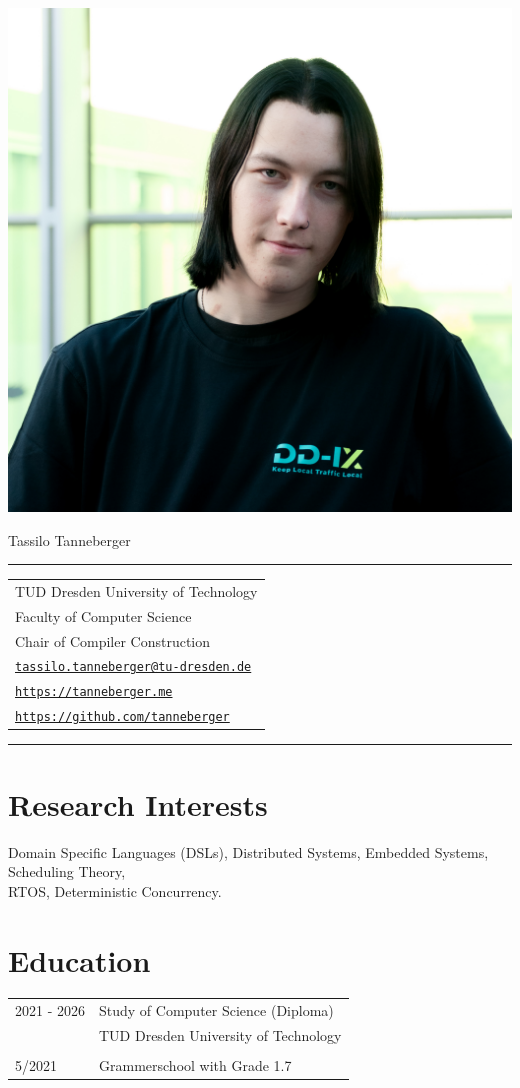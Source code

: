 \documentclass[11pt, a4paper, oneside]{article}
\begin{document}
\includegraphics[width=0.3\linewidth, right]{Tassilo} 
\vspace*{-15em}
\begin{flushleft}
\hspace*{1.3em} \huge Tassilo Tanneberger
\vspace*{-0.5em}
\par\noindent\rule{0.6\textwidth}{0.4pt}
\end{flushleft}

\vspace*{-0.4em}

\begin{tabular}{l}
TUD Dresden University of Technology  \\
Faculty of Computer Science \\ 
Chair of Compiler Construction \\ 
\href{mailto: tassilo.tanneberger@tu-dresden.de}{\texttt{tassilo.tanneberger@tu-dresden.de}} \\
\href{https://tanneberger.me}{\texttt{https://tanneberger.me}} \\
\href{https://github.com/tanneberger}{\texttt{https://github.com/tanneberger}}
\end{tabular}

\par\noindent\rule{0.6\textwidth}{0.4pt}

\section*{Research Interests}

Domain Specific Languages (DSLs), Distributed Systems, Embedded Systems, Scheduling Theory, \\ RTOS,  Deterministic Concurrency.  

\section*{Education}

\begin{tabular}{ R{3cm} L{10cm}}
	2021 - 2026 &  Study of Computer Science (Diploma) \\
							& TUD Dresden University of Technology \\ 
							&			\\
	5/2021			& Grammerschool with Grade 1.7
\end{tabular}
\end{document}
